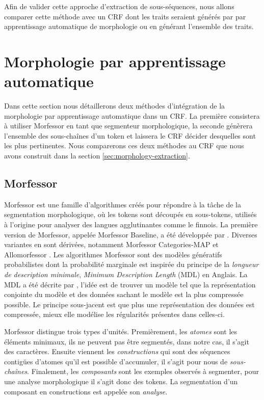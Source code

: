 \documentclass[12pt,a4paper,times,twoside,openright]{report}
\begin{document}
Afin de valider cette approche d'extraction de sous-séquences, nous allons comparer cette méthode avec un CRF dont les traits seraient générés par par apprentissage automatique de morphologie ou en générant l'ensemble des traits.


    
    \section{Morphologie par apprentissage automatique}
    \label{sec:ML-morphology}
Dans cette section nous détaillerons deux méthodes d'intégration de la morphologie par apprentissage automatique dans un CRF. La première consistera à utiliser Morfessor en tant que segmenteur morphologique, la seconde génèrera l'ensemble des sous-chaînes d'un token et laissera le CRF décider desquelles sont les plus pertinentes. Nous comparerons ces deux méthodes au CRF que nous avons construit dans la section \ref{sec:morphology-extraction}.


        
        \subsection{Morfessor}
        \label{subsec:morfessor}
Morfessor \citep{creutz2005unsupervised,virpioja2013morfessor} est une famille d'algorithmes créés pour répondre à la tâche de la segmentation morphologique, où les tokens sont découpés en sous-tokens, utilisés à l'origine pour analyser des langues agglutinantes comme le finnois. La première version de Morfessor, appelée Morfessor Baseline, a été développée par \citet{creutz2002unsupervised}. Diverses variantes en sont dérivées, notamment Morfessor Categories-MAP \citep{creutz2005inducing} et Allomorfessor \citep{virpioja2009unsupervised}. Les algorithmes Morfessor sont des modèles génératifs probabilistes dont la probabilité marginale est inspirée du principe de la \emph{longueur de description minimale}, \emph{Minimum Description Length} (MDL) en Anglais. La MDL a été décrite par \citet{rissanen1978modeling}, l'idée est de trouver un modèle tel que la représentation conjointe du modèle et des données sachant le modèle est la plus compressée possible. Le principe sous-jacent est que plus une représentation des données est compressée, mieux elle modélise les régularités présentes dans celles-ci.

Morfessor distingue trois types d'unités. Premièrement, les \emph{atomes} sont les éléments minimaux, ils ne peuvent pas être segmentés, dans notre cas, il s'agit des caractères. Ensuite viennent les \emph{constructions} qui sont des séquences contigües d'atomes qu'il est possible d'accumuler, il s'agit pour nous de \emph{sous-chaînes}. Finalement, les \emph{composants} sont les exemples observés à segmenter, pour une analyse morphologique il s'agit donc des tokens. La segmentation d'un composant en constructions est appelée son \emph{analyse}.
\end{document}
